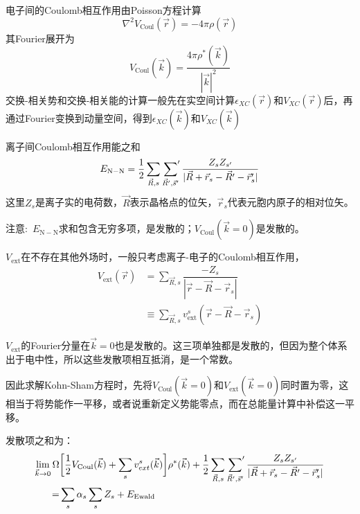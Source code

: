 电子间的\textrm{Coulomb}相互作用由\textrm{Poisson}方程计算
\begin{equation}
	\nabla^2V_{\mathrm{Coul}}(\vec r)=-4\pi\rho(\vec r)
\end{equation}
其\textrm{Fourier}展开为
\begin{equation}
	V_{\mathrm{Coul}}(\vec k)=\dfrac{4\pi\rho^{\ast}(\vec k)}{|\vec k|^2}
\end{equation}
交换-相关势和交换-相关能的计算一般先在实空间计算$\epsilon_{XC}(\vec r)$和$V_{XC}(\vec r)$后，再通过\textrm{Fourier}变换到动量空间，得到$\epsilon_{XC}(\vec k)$和$V_{XC}(\vec k)$

离子间\textrm{Coulomb}相互作用能之和
\begin{equation}
	E_{\mathrm{N-N}}=\dfrac12\sum_{\vec R,s}\sideset{}{^{\prime}}\sum_{\vec R^{\prime},\vec s^{\prime}}\dfrac{Z_sZ_{s^{\prime}}}{|\vec R+\vec r_s-\vec R^{\prime}-\vec r_s^{\prime}|}
\end{equation}
这里$Z_s$是离子实的电荷数，$\vec R$表示晶格点的位矢，$\vec r_s$代表元胞内原子的相对位矢。

注意:~$E_{\mathrm{N-N}}$求和包含无穷多项，是发散的；$V_{\mathrm{Coul}}(\vec k=0)$是发散的。
	
$V_{\mathrm{ext}}$在不存在其他外场时，一般只考虑离子-电子的\textrm{Coulomb}相互作用，
	\begin{equation}
		\begin{aligned}
			V_{\mathrm{ext}}(\vec r)&=\sum_{\vec R,s}\dfrac{-Z_s}{|\vec r-\vec R-\vec r_s|}\\
			&\equiv\sum_{\vec R,s}v_{\mathrm{ext}}^s(\vec r-\vec R-\vec r_s)
		\end{aligned}
	\end{equation}

$V_{\mathrm{ext}}$的\textrm{Fourier}分量在$\vec k=0$也是发散的。这三项单独都是发散的，但因为整个体系出于电中性，所以这些发散项相互抵消，是一个常数。

因此求解\textrm{Kohn-Sham}方程时，先将$V_{\mathrm{Coul}}(\vec k=0)$和$V_{\mathrm{ext}}(\vec k=0)$同时置为零，这相当于将势能作一平移，或者说重新定义势能零点，而在总能量计算中补偿这一平移。

发散项之和为：
	\begin{equation}
		\begin{aligned}
			\lim_{\vec k\rightarrow0}\Omega&\bigg[\dfrac12V_{\mathrm{Coul}}(\vec k)+\sum_sv_{ext}^s(\vec k)\bigg]\rho^{\ast}(\vec k)+\dfrac12\sum_{\vec R,s}\sideset{}{^{\prime}}\sum_{\vec R^{\prime},\vec s^{\prime}}\dfrac{Z_sZ_{s^{\prime}}}{|\vec R+\vec r_s-\vec R^{\prime}-\vec r_s^{\prime}|}\\
			=&\sum_s\alpha_s\sum_sZ_s+E_{\mathrm{Ewald}}
		\end{aligned}
	\end{equation}

